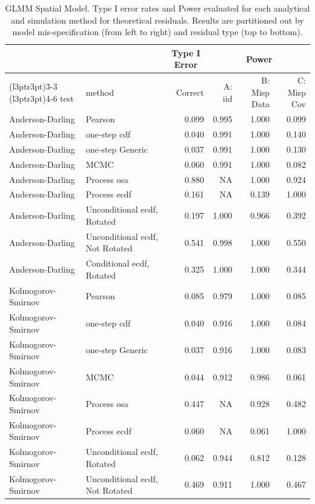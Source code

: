 \documentclass[
]{article}
\begin{document}
\begin{table}[H]
\centering
\caption{\label{tab:spatial-results-glmm-theor}GLMM Spatial Model. Type I error rates and Power evaluated for each analytical and simulation method for theoretical residuals. Results are partitioned out by model mis-specification (from left to right) and residual type (top to bottom).}
\centering
\begin{tabular}[t]{llrrrr}
\toprule
\multicolumn{1}{c}{ } & \multicolumn{1}{c}{ } & \multicolumn{1}{c}{Type I Error} & \multicolumn{3}{c}{Power} \\
\cmidrule(l{3pt}r{3pt}){3-3} \cmidrule(l{3pt}r{3pt}){4-6}
test & method & Correct & A: iid & B: Misp Data & C: Misp Cov\\
\midrule
Anderson-Darling & Pearson & 0.099 & 0.995 & 1.000 & 0.099\\
Anderson-Darling & one-step cdf & 0.040 & 0.991 & 1.000 & 0.140\\
Anderson-Darling & one-step Generic & 0.037 & 0.991 & 1.000 & 0.130\\
Anderson-Darling & MCMC & 0.060 & 0.991 & 1.000 & 0.082\\
Anderson-Darling & Process osa & 0.880 & NA & 1.000 & 0.924\\
\addlinespace
Anderson-Darling & Process ecdf & 0.161 & NA & 0.139 & 1.000\\
Anderson-Darling & Unconditional ecdf, Rotated & 0.197 & 1.000 & 0.966 & 0.392\\
Anderson-Darling & Unconditional ecdf, Not Rotated & 0.541 & 0.998 & 1.000 & 0.550\\
Anderson-Darling & Conditional ecdf, Rotated & 0.325 & 1.000 & 1.000 & 0.344\\
Kolmogorov- Smirnov & Pearson & 0.085 & 0.979 & 1.000 & 0.085\\
\addlinespace
Kolmogorov- Smirnov & one-step cdf & 0.040 & 0.916 & 1.000 & 0.084\\
Kolmogorov- Smirnov & one-step Generic & 0.037 & 0.916 & 1.000 & 0.083\\
Kolmogorov- Smirnov & MCMC & 0.044 & 0.912 & 0.986 & 0.061\\
Kolmogorov- Smirnov & Process osa & 0.447 & NA & 0.928 & 0.482\\
Kolmogorov- Smirnov & Process ecdf & 0.060 & NA & 0.061 & 1.000\\
\addlinespace
Kolmogorov- Smirnov & Unconditional ecdf, Rotated & 0.062 & 0.944 & 0.812 & 0.128\\
Kolmogorov- Smirnov & Unconditional ecdf, Not Rotated & 0.469 & 0.911 & 1.000 & 0.467\\

\end{tabular}
\end{table}
\end{document}
